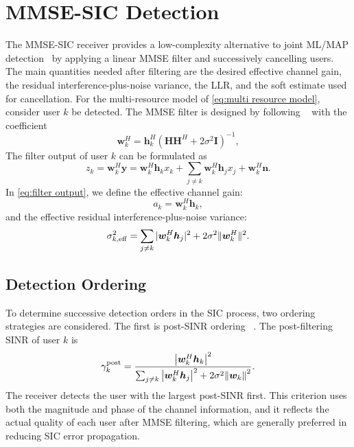 \section{MMSE-SIC Detection}
The MMSE-SIC receiver provides a low-complexity alternative to joint ML/MAP detection~\cite{zanella2005mmse} by applying a linear MMSE filter and successively cancelling users.
The main quantities needed after filtering are the desired effective channel gain, the residual interference-plus-noise variance, the LLR, and the soft estimate used for cancellation.
For the multi-resource model of \eqref{eq:multi resource model}, 
consider user $k$ be detected. The MMSE filter is designed by following ~\cite[Eqs. (6), (7)]{kong2016multiuser} with the coefficient
\begin{equation}
\label{eq:coefficient}
    \bm{w}_k^H
    =
    \bm{h}_k^H
    \left(
    \bm{H}\bm{H}^H + 2\sigma^2\bm{I}
    \right)^{-1},
\end{equation}
The filter output of user $k$ can be formulated as
\begin{equation}
    \label{eq:filter output}
    z_k
    =
    \bm{w}_k^H \bm{y}
    =
    \bm{w}_k^H \bm{h}_k x_k
    +
    \sum_{j\neq k}\bm{w}_k^H \bm{h}_j x_j
    +
    \bm{w}_k^H \bm{n}.
\end{equation}
In \eqref{eq:filter output}, we define the effective channel gain:
\begin{equation}
    a_k=\bm{w}_k^H\bm{h}_k,
\end{equation}
and the effective residual interference-plus-noise variance:
\begin{equation}
	\label{eq:effective noise}
    \sigma_{k,\rm eff}^2
    =
    \sum_{j\neq k}
    |\bm{w}_k^H \bm{h}_j|^2
    +
    2\sigma^2 \|\bm{w}_k^H \|^2.
\end{equation}

\subsection{Detection Ordering}
\label{sec:MMSE SIC detection order}
To determine  successive detection orders in the SIC process, two ordering strategies are considered. The first is post-SINR ordering ~\cite{li2013advanced}. The post-filtering SINR of user \(k\) is
\begin{equation}
    \gamma^{\mathrm{post}}_k
    =
    \frac{\abs{\bm{w}_k^H\bm{h}_k}^2}
    {\sum_{j\ne k}\abs{\bm{w}_k^H\bm{h}_j}^2+2\sigma^2\norm{\bm{w}_k}^2}.
    \label{eq:post-sinr}
\end{equation}
The receiver detects the user with the largest post-SINR first. This criterion uses both the magnitude and phase of the channel information, and it reflects the actual quality of each user after MMSE filtering, which are generally preferred in reducing SIC error propagation.

